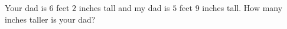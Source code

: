 Your dad is $6$ feet $2$ inches tall and my dad is $5$ feet $9$ inches tall. How many inches taller is your dad?
